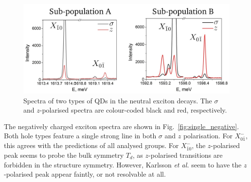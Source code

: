 \begin{figure}
\begin{center}
\includegraphics[width=\textwidth]{figures/single_neutral}
\end{center}
\caption{Spectra of two types of QDs in the neutral exciton decays. The $\sigma$ and $z$-polarised spectra are colour-coded black and red, respectively.\label{fig:single_neutral}}
\end{figure}

The negatively charged exciton spectra are shown in Fig.~\ref{fig:single_negative}. Both hole types feature a single strong line in both $\sigma$ and $z$ polarisation. For $X^-_{0\bar{1}}$, this agrees with the predictions of all analysed groups. For $X^-_{\bar{1}0}$, the $z$-polarised peak seems to probe the bulk symmetry $T_d$, as $z$-polarised transitions are forbidden in the structure symmetry. However, Karlsson \textit{et al.} seem to have the $z$-polarised peak appear faintly, or not resolvable at all.
\\\hfill\\
\\\hfill\\

